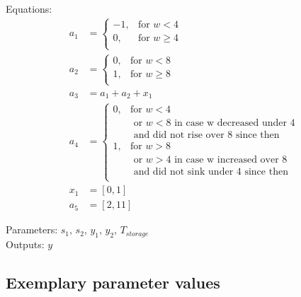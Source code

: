 \documentclass[10pt,a4paper]{article}
\begin{document}
	\noindent Equations:
	\begin{subequations}
	\begin{align}
		a_1 &=
		\begin{cases}
        -1, & \text{for } w < 4\\
        0, & \text{for } w\geq 4\\
        \end{cases} \\
        a_2 &=
		\begin{cases}
        0, & \text{for } w < 8\\
        1, & \text{for } w\geq 8\\
        \end{cases} \\
        a_3 &= a_1 + a_2 + x_1 \\
        a_4 &=
		\begin{cases}
        0, & \text{for } w < 4 \\
        & \text{ or } w < 8 \text{ in case w decreased under 4} \\
        & \text{ and did not rise over 8 since then}\\
        1, & \text{for } w > 8 \\
        & \text{ or } w > 4 \text{ in case w increased over 8} \\
        & \text{ and did not sink under 4 since then} \\
        \end{cases} \\
        x_1 &= [0, 1] \\
        a_5 &= [2, 11]
	\end{align}
	\end{subequations}

	\noindent
	Parameters: $s_1, \, s_2, \, y_1, \, y_2, \, T_{storage}$%
	\\
	Outputs: $y$ %



	\subsection{Exemplary parameter values}
	

\end{document}
